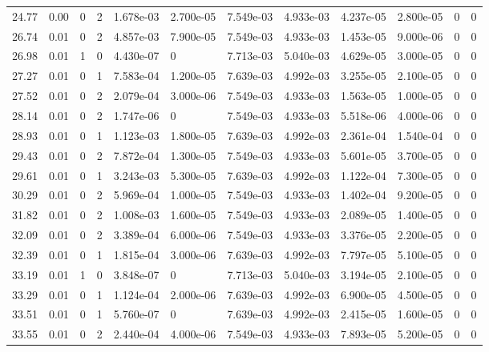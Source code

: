 \documentclass[preview]{standalone}
\begin{document}
{{{\begin{tabular}{L{1.2cm}C{1.2cm} C{0.3cm}C{0.5cm} C{1.4cm}C{1.4cm} C{1.4cm}C{1.4cm} C{1.6cm}C{1.6cm} C{1.6cm}C{1.6cm}}
  24.77  &  0.00  & 0     &  2 &  1.678e-03  & 2.700e-05  &  7.549e-03&   4.933e-03& 4.237e-05 & 2.800e-05   &  0 & 0  \\ 
  26.74  &  0.01  & 0     &  2 &  4.857e-03  & 7.900e-05  &  7.549e-03&   4.933e-03& 1.453e-05 & 9.000e-06   &  0 & 0  \\ 
  26.98  &  0.01  & 1     &  0 &  4.430e-07  & 0  &  7.713e-03&   5.040e-03& 4.629e-05 & 3.000e-05   &  0 & 0  \\ 
  27.27  &  0.01  & 0     &  1 &  7.583e-04  & 1.200e-05  &  7.639e-03&   4.992e-03& 3.255e-05 & 2.100e-05   &  0 & 0  \\ 
  27.52  &  0.01  & 0     &  2 &  2.079e-04  & 3.000e-06  &  7.549e-03&   4.933e-03& 1.563e-05 & 1.000e-05   &  0 & 0  \\ 
  28.14  &  0.01  & 0     &  2 &  1.747e-06  & 0  &  7.549e-03&   4.933e-03& 5.518e-06 & 4.000e-06   &  0 & 0  \\ 
  28.93  &  0.01  & 0     &  1 &  1.123e-03  & 1.800e-05  &  7.639e-03&   4.992e-03& 2.361e-04 & 1.540e-04   &  0 & 0  \\ 
  29.43  &  0.01  & 0     &  2 &  7.872e-04  & 1.300e-05  &  7.549e-03&   4.933e-03& 5.601e-05 & 3.700e-05   &  0 & 0  \\ 
  29.61  &  0.01  & 0     &  1 &  3.243e-03  & 5.300e-05  &  7.639e-03&   4.992e-03& 1.122e-04 & 7.300e-05   &  0 & 0  \\ 
  30.29  &  0.01  & 0     &  2 &  5.969e-04  & 1.000e-05  &  7.549e-03&   4.933e-03& 1.402e-04 & 9.200e-05   &  0 & 0  \\ 
  31.82  &  0.01  & 0     &  2 &  1.008e-03  & 1.600e-05  &  7.549e-03&   4.933e-03& 2.089e-05 & 1.400e-05   &  0 & 0  \\ 
  32.09  &  0.01  & 0     &  2 &  3.389e-04  & 6.000e-06  &  7.549e-03&   4.933e-03& 3.376e-05 & 2.200e-05   &  0 & 0  \\ 
  32.39  &  0.01  & 0     &  1 &  1.815e-04  & 3.000e-06  &  7.639e-03&   4.992e-03& 7.797e-05 & 5.100e-05   &  0 & 0  \\ 
  33.19  &  0.01  & 1     &  0 &  3.848e-07  & 0  &  7.713e-03&   5.040e-03& 3.194e-05 & 2.100e-05   &  0 & 0  \\ 
  33.29  &  0.01  & 0     &  1 &  1.124e-04  & 2.000e-06  &  7.639e-03&   4.992e-03& 6.900e-05 & 4.500e-05   &  0 & 0  \\ 
  33.51  &  0.01  & 0     &  1 &  5.760e-07  & 0  &  7.639e-03&   4.992e-03& 2.415e-05 & 1.600e-05   &  0 & 0  \\ 
  33.55  &  0.01  & 0     &  2 &  2.440e-04  & 4.000e-06  &  7.549e-03&   4.933e-03& 7.893e-05 & 5.200e-05   &  0 & 0  \\ 

\end{tabular}}}}
\end{document}

